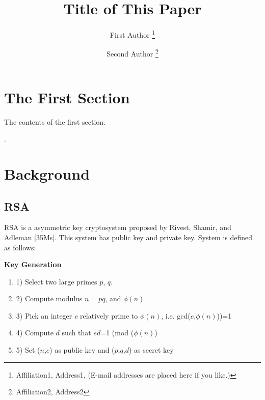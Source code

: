 \documentclass[a4paper]{article}
\begin{document}
\title{
  Title of This Paper     %
}
\author{
  First Author           %
  \thanks{
    Affiliation1, Address1,   %
    (E-mail addresses are placed here if you like.)
  }
  \and
  Second Author          %
  \thanks{ %
    Affiliation2, Address2  %
  }
}

\maketitle

\section{The First Section}

The contents of the first section.

\newpage
.
\newpage
\section{Background}

\subsection {RSA}
RSA is a asymmetric key cryptosystem proposed by Rivest, Shamir, and Adleman [35Ms]. This system has public key and private key. System is defined as follows:

\textbf{Key Generation}
\begin{enumerate}[label=]
      \item 1) Select two large primes $p$, $q$.
      
      \item 2) Compute modulus $n=pq$, and $\phi(n)$ 
      
      \item 3) Pick an integer \textit{e} relatively prime to $\phi(n)$, i.e. gcd($e$,$\phi(n)$))=1
      
      \item 4) Compute $d$ such that $ed$=1 (mod ($\phi(n)$)
      
      \item 5) Set ($n$,$e$) as public key  and ($p$,$q$,$d$) as secret key  
\end{enumerate}
\end{document}
